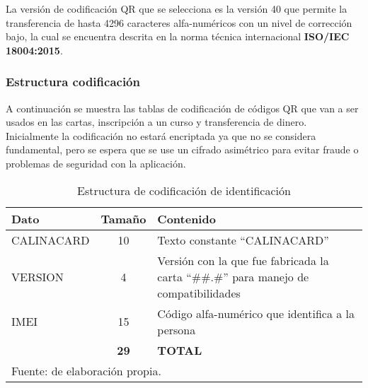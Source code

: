 La versión de codificación QR que se selecciona es la versión 40 que permite la transferencia de hasta 4296 
caracteres alfa-numéricos con un nivel de corrección bajo, la cual se encuentra descrita en la norma técnica 
internacional \textbf{ISO/IEC 18004:2015}.

\subsubsection{Estructura codificación}

A continuación se muestra las tablas de codificación de códigos QR que van a ser usados en las cartas, 
inscripción a un curso y transferencia de dinero. Inicialmente la codificación no estará encriptada ya que no 
se considera fundamental, pero se espera que se use un cifrado asimétrico para evitar fraude o problemas de 
seguridad con la aplicación.

\begin{table}[!htb]
\caption{Estructura de codificación de identificación}
\label{tab:codificacionid}
\begin{center}
\footnotesize
\begin{tabular}{ p{40mm} c p{100mm}}
\toprule
\textbf{Dato} & \textbf{Tamaño} & \textbf{Contenido}\\ 
\midrule
CALINACARD & 10 & Texto constante ``CALINACARD''\\
\midrule
VERSION & 4 & Versión con la que fue fabricada la carta ``\#\#.\#'' para manejo de compatibilidades\\
\midrule
IMEI & 15 & Código alfa-numérico que identifica a la persona\\
\bottomrule
& \textbf{29} & \textbf{TOTAL}\\
\bottomrule
\multicolumn{3}{l}{\footnotesize Fuente: de elaboración propia.}\\
\end{tabular}
\end{center}
\end{table}

